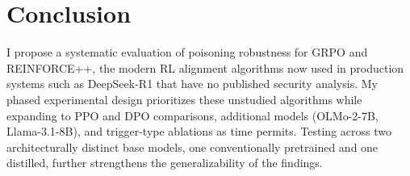\documentclass[12pt]{article}
\begin{document}
\section{Conclusion}

I propose a systematic evaluation of poisoning robustness for GRPO and REINFORCE++, the modern RL alignment algorithms now used in production systems such as DeepSeek-R1 that have no published security analysis. My phased experimental design prioritizes these unstudied algorithms while expanding to PPO and DPO comparisons, additional models (OLMo-2-7B, Llama-3.1-8B), and trigger-type ablations as time permits. Testing across two architecturally distinct base models, one conventionally pretrained and one distilled, further strengthens the generalizability of the findings.



\end{document}

